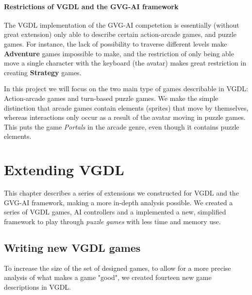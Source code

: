 \documentclass[a4paper,titlepage,final]{report}
\begin{document}
\subsubsection*{Restrictions of VGDL and the GVG-AI framework}
\label{ssec_gamegenres}
The VGDL implementation of the GVG-AI competetion is essentially (without great extension) only able to describe certain action-arcade games, and puzzle games.
For instance, the lack of possibility to traverse different levels make \textbf{Adventure} games impossible to make, and the restriction of only being able move a single character with the keyboard (the avatar) makes great restriction in creating \textbf{Strategy} games.

In this project we will focus on the two main type of games describable in VGDL: Action-arcade games and turn-based puzzle games. We make the simple distinction that arcade games contain elements (sprites) that move by themselves, whereas interactions only occur as a result of the avatar moving in puzzle games.
This puts the game \emph{Portals} in the arcade genre, even though it contains puzzle elements.










\chapter{Extending VGDL}
\label{ch_extending}
This chapter describes a series of extensions we constructed for VGDL and the GVG-AI framework, making a more in-depth analysis possible.
We created a series of VGDL games, AI controllers and a implemented a new, simplified framework to play through \textit{puzzle games} with less time and memory use.


\section{Writing new VGDL games}
\label{sec_writingnewvgdl}
To increase the size of the set of designed games, to allow for a more precise analysis of what makes a game "good", we created fourteen new game descriptions in VGDL. 
\end{document}
